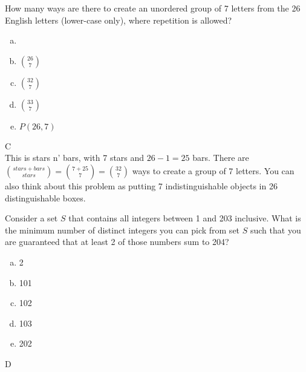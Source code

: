 
How many ways are there to create an unordered group of 7 letters from the 26 English letters (lower-case only), where repetition is allowed?  
\begin{enumerate}[(a)]
	\item  {}
    
	\item  $\binom{26}{7}$
    
	\item  $\binom{32}{7}$
    
	\item  $\binom{33}{7}$
    
	\item  $P(26, 7)$

\end{enumerate}
\begin{solution}

C
\\
This is stars n' bars, with 7 stars and $26-1=25$ bars. There are $\binom{stars+bars}{stars} = \binom{7+25}{7}=\binom{32}{7}$ ways to create a group of 7 letters. You can also think about this problem as putting 7 indistinguishable objects in 26 distinguishable boxes.

\end{solution}


Consider a set $S$ that contains all integers between 1 and 203 inclusive. What is the minimum number of distinct integers you can pick from set $S$ such that you are guaranteed that at least 2 of those numbers sum to 204?\\

\begin{enumerate}[(a)]
	\item  2

	\item  101

	\item  102

	\item  103

	\item  202

\end{enumerate}
\begin{solution}

D

\end{solution}

